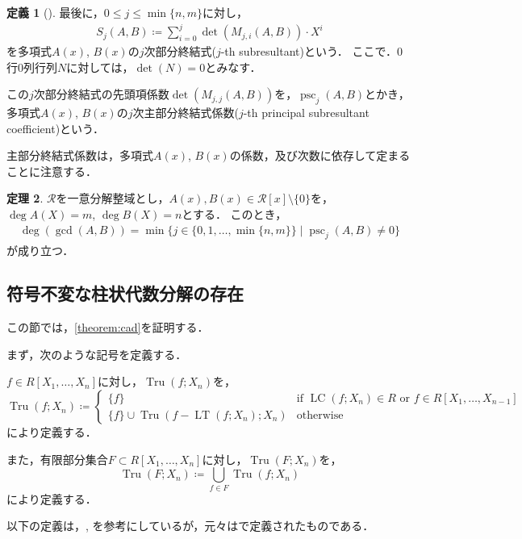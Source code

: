\documentclass[uplatex, dvipdfmx]{jsarticle}
\numberwithin{equation}{section}
\DeclareMathOperator{\psc}{psc}
\DeclareMathOperator{\Tru}{Tru}
\DeclareMathOperator{\LT}{LT}
\DeclareMathOperator{\LC}{LC}
\theoremstyle{definition}
\newtheorem{definition}{定義}[section]
\newtheorem{theorem}[definition]{定理}
\begin{document}
\begin{definition}[{\cite[Definition 7.7.1]{MR1239443}}]
最後に，$0 \leq j \leq \min\{n, m\}$に対し，
\begin{align}
S_j(A, B) \coloneqq \sum_{i=0}^j \det (M_{j, i}(A,B)) \cdot X^i 
\end{align}
を多項式$A(x)$, $B(x)$の$j$次部分終結式($j$-th subresultant)という．
ここで．$0$行$0$列行列$N$に対しては，$\det(N)=0$とみなす．

この$j$次部分終結式の先頭項係数$\det (M_{j,j}(A,B))$を，$\psc_j(A,B)$とかき，多項式$A(x)$, $B(x)$の$j$次主部分終結式係数($j$-th principal subresultant coefficient)という．
\end{definition}

主部分終結式係数は，多項式$A(x)$, $B(x)$の係数，及び次数に依存して定まることに注意する．

\begin{theorem}\label{theorem:psc}
     $\mathcal{R}$を一意分解整域とし，$A(x), B(x) \in \mathcal{R}[x] \setminus \{0\}$を，$\deg A(X) = m$, $\deg B(X) = n$とする．
     このとき，
     \begin{align}
          \deg(\gcd(A, B)) = \min \{ j  \in \{0,1, \dots, \min\{n,m\}\}\mid \psc_j(A,B) \neq 0\}
     \end{align}
     が成り立つ．
\end{theorem}

\subsection{符号不変な柱状代数分解の存在}
この節では，\cref{theorem:cad}を証明する．

まず，次のような記号を定義する．

$f \in R[X_1, \dots, X_n]$に対し，$\Tru(f;X_n)$を，
\begin{equation}
     \Tru(f;X_n)\coloneqq \begin{cases}
          \{f\} &  \text{if $\LC(f; X_n) \in R$ or $f \in R[X_1, \dots, X_{n-1}]$} \\
          \{f\} \cup \Tru(f-\LT(f;X_n);X_n) & \text{otherwise}
     \end{cases}
\end{equation}
により定義する．

また，有限部分集合$F \subset R[X_1, \dots, X_n]$に対し，$\Tru(F;X_n)$を，
\begin{equation}
     \Tru(F;X_n) \coloneqq \bigcup_{f \in F} \Tru(f;X_n)
\end{equation}
により定義する．

以下の定義は，\cite[Section 3]{MR0764184}, \cite[Notation 5.15.]{MR2248869}
を参考にしているが，元々は\cite[Theorem 4]{MR0403962}で定義されたものである．
\end{document}
